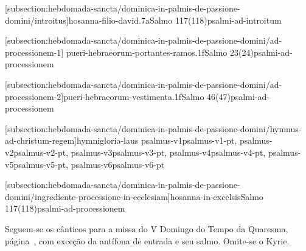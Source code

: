 \def\Prefix{subsection:hebdomada-sancta/dominica-in-palmis-de-passione-domini}

[\Prefix/introitus]{hosanna-filio-david.7a}{Salmo 117(118)}{psalmi-ad-introitum}

\AllowPageBreak

[\Prefix/ad-processionem-1]
{pueri-hebraeorum-portantes-ramos.1f}{Salmo 23(24)}{psalmi-ad-processionem}

\AllowPageFlush

[\Prefix/ad-processionem-2]{pueri-hebraeorum-vestimenta.1f}{Salmo 46(47)}{psalmi-ad-processionem}

[\Prefix/hymnus-ad-christum-regem]{hymni}{gloria-laus}{
  {psalmus-v1}{psalmus-v1-pt},
  {psalmus-v2}{psalmus-v2-pt},
  {psalmus-v3}{psalmus-v3-pt},
  {psalmus-v4}{psalmus-v4-pt},
  {psalmus-v5}{psalmus-v5-pt},
  {psalmus-v6}{psalmus-v6-pt}
}

[\Prefix/ingrediente-processione-in-ecclesiam]{hosanna-in-excelsis}{Salmo 117(118)}{psalmi-ad-processionem}

\begin{rubrica}
  Seguem-se os cânticos para a missa do V Domingo do Tempo da Quaresma, página~\pageref{section:tempus-quadragesimae/dominica-5}, com exceção da antífona de entrada e seu salmo. Omite-se o Kyrie.
\end{rubrica}